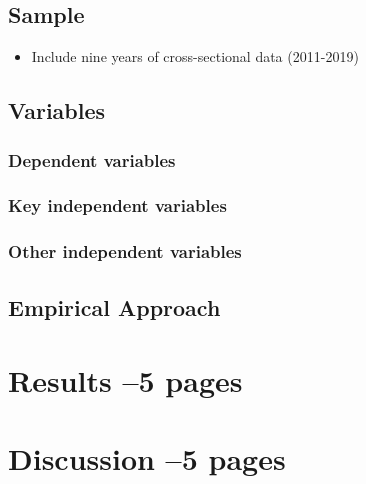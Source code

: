 \documentclass[10pt, oneside]{article}
\begin{document}
\subsection{Sample}

\begin{itemize}
    \item Include nine years of cross-sectional data (2011-2019)
\end{itemize}

\subsection{Variables}


\subsubsection{Dependent variables}
\subsubsection{Key independent variables}
\subsubsection{Other independent variables}
\subsection{Empirical Approach}

\section{Results --5 pages}

\section{Discussion --5 pages}
\end{document}

